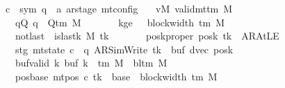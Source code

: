 \begin{isabellebody}
\ \ \ \ \ c{\isacharprime}{\kern0pt}\ {\isacharcolon}{\kern0pt}{\isacharcolon}{\kern0pt}\ {\isachardoublequoteopen}{\isacharparenleft}{\kern0pt}sym{}{\isacharcomma}{\kern0pt}\ {\isacharprime}{\kern0pt}q\ {\isasymtimes}\ {\isacharprime}{\kern0pt}a\ ar{\isacharunderscore}{\kern0pt}stage{\isacharparenright}{\kern0pt}\ mt{\isacharunderscore}{\kern0pt}config{\isachardoublequoteclose}\isanewline
\ \ \ vM{\isacharcolon}{\kern0pt}\ {\isachardoublequoteopen}valid{\isacharunderscore}{\kern0pt}mttm\ M{\isachardoublequoteclose}\isanewline
\ \ \ \ \ \ \ qQ{\isacharcolon}{\kern0pt}\ {\isachardoublequoteopen}q\ {\isasymin}\ Q{\isacharunderscore}{\kern0pt}tm\ M{\isachardoublequoteclose}\isanewline
\ \ \ \ \ \ \ kge{}{\isacharcolon}{\kern0pt}\ {\isachardoublequoteopen}{}\ {\isasymle}\ block{\isacharunderscore}{\kern0pt}width\ {\isacharparenleft}{\kern0pt}{\isasymGamma}{\isacharunderscore}{\kern0pt}tm\ M{\isacharparenright}{\kern0pt}{\isachardoublequoteclose}\isanewline
\ \ \ \ \ \ \ notlast{\isacharcolon}{\kern0pt}\ {\isachardoublequoteopen}{\isasymnot}\ is{\isacharunderscore}{\kern0pt}last{\isacharunderscore}{\kern0pt}k\ M\ tk{\isachardoublequoteclose}\isanewline
\ \ \ \ \ \ \ poskproper{\isacharcolon}{\kern0pt}\ {\isachardoublequoteopen}posk\ tk\ {\isasymnoteq}\ AR{\isacharunderscore}{\kern0pt}AtLE{\isachardoublequoteclose}\isanewline
\ \ \ \ \ \ \ stg{\isacharcolon}{\kern0pt}\ {\isachardoublequoteopen}mt{\isacharunderscore}{\kern0pt}state\ c{\isacharprime}{\kern0pt}\ {\isacharequal}{\kern0pt}\ {\isacharparenleft}{\kern0pt}q{\isacharcomma}{\kern0pt}\ AR{\isacharunderscore}{\kern0pt}SimWrite{\isacharcomma}{\kern0pt}\ tk{\isacharcomma}{\kern0pt}\ {}{\isacharcomma}{\kern0pt}\ buf{\isacharcomma}{\kern0pt}\ dvec{\isacharcomma}{\kern0pt}\ posk{\isacharparenright}{\kern0pt}{\isachardoublequoteclose}\isanewline
\ \ \ \ \ \ \ buf{\isacharunderscore}{\kern0pt}valid{\isacharcolon}{\kern0pt}\ {\isachardoublequoteopen}{\isasymforall}k{\isachardot}{\kern0pt}\ buf\ k\ {\isasymin}\ {\isasymGamma}{\isacharunderscore}{\kern0pt}tm\ M\ {\isasymunion}\ {\isacharbraceleft}{\kern0pt}bl{\isacharunderscore}{\kern0pt}tm\ M{\isacharbraceright}{\kern0pt}{\isachardoublequoteclose}\isanewline
\ \ \ \ \ \ \ pos{\isacharunderscore}{\kern0pt}base{\isacharcolon}{\kern0pt}\ {\isachardoublequoteopen}mt{\isacharunderscore}{\kern0pt}pos\ c{\isacharprime}{\kern0pt}\ tk\ {\isacharequal}{\kern0pt}\ base\ {\isacharplus}{\kern0pt}\ block{\isacharunderscore}{\kern0pt}width\ {\isacharparenleft}{\kern0pt}{\isasymGamma}{\isacharunderscore}{\kern0pt}tm\ M{\isacharparenright}{\kern0pt}{\isachardoublequoteclose}\isanewline

\end{isabellebody}
